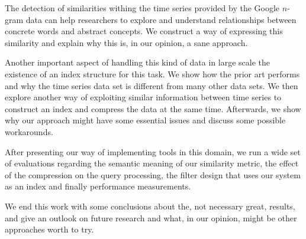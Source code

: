 \Abstract{}

The detection of similarities withing the time series provided by the Google $n$-gram data can help researchers to explore and understand relationships between concrete words and abstract concepts. We construct a way of expressing this similarity and explain why this is, in our opinion, a sane approach.

Another important aspect of handling this kind of data in large scale the existence of an index structure for this task. We show how the prior art performs and why the time series data set is different from many other data sets. We then explore another way of exploiting similar information between time series to construct an index and compress the data at the same time. Afterwards, we show why our approach might have some essential issues and discuss some possible workarounds.

After presenting our way of implementing tools in this domain, we run a wide set of evaluations regarding the semantic meaning of our similarity metric, the effect of the compression on the query processing, the filter design that uses our system as an index and finally performance measurements.

We end this work with some conclusions about the, not necessary great, results, and give an outlook on future research and what, in our opinion, might be other approaches worth to try.
